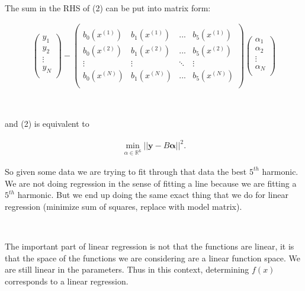 \documentclass[]{article}
\begin{document}
~

The sum in the RHS of (2) can be put into matrix form:

\begin{align}
     \begin{pmatrix} y_1 \\ y_2 \\ \vdots \\ y_N \\[.25 em]  \end{pmatrix} -
      \begin{pmatrix}
        \\[-.75em]
        b_0\left(x^{(1)}\right) & b_1\left(x^{(1)}\right) & ... &  b_5\left(x^{(1)}\right)   \\[.5em]
        b_0\left(x^{(2)}\right) & b_1\left(x^{(2)}\right) & ...  & b_5\left(x^{(2)}\right)  \\[.5em]
        \vdots & \vdots & \ddots & \vdots  \\[.5em]
        b_0\left(x^{(N)}\right) & b_1\left(x^{(N)}\right) &...  &  b_5\left(x^{(N)}\right)   \\[.5em]
        \end{pmatrix}
        \begin{pmatrix} \alpha_1 \\ \alpha_2 \\ \vdots \\ \alpha_N \\[.25 em]  \end{pmatrix}
 \end{align}

~

and (2) is equivalent to

\begin{align}
    \min\limits_{\alpha \in \mathbb{R}^6 } ||{\bm y}-B{\bm \alpha}||^2. 
\end{align}

So given some data we are trying to fit through that data the best
\(5^{th}\) harmonic. We are not doing regression in the sense of fitting
a line because we are fitting a \(5^{th}\) harmonic. But we end up doing
the same exact thing that we do for linear regression (minimize sum of
squares, replace with model matrix).

~

The important part of linear regression is not that the functions are
linear, it is that the space of the functions we are considering are a
linear function space. We are still linear in the parameters. Thus in
this context, determining \(f(x)\) corresponds to a linear regression.
\end{document}
